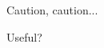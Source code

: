 \begin{tdoccaut}
    Caution, caution...
\end{tdoccaut}

\begin{tdoccaut}
    Useful?
\end{tdoccaut}
